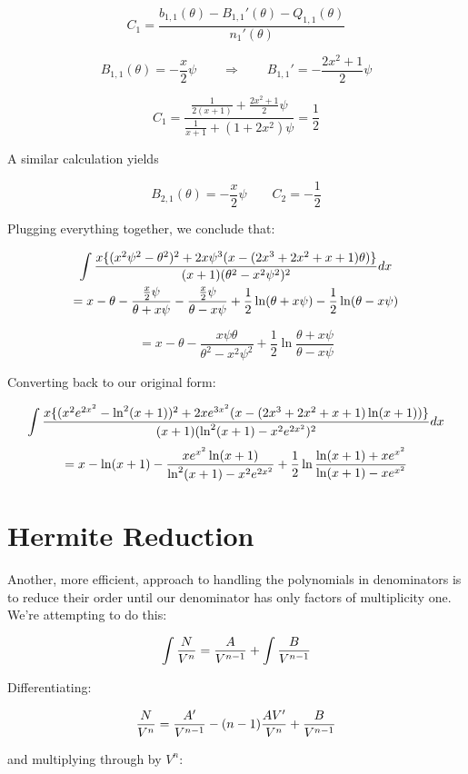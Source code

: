 $$ C_1 = \frac{b_{1,1}(\theta) - B_{1,1}'(\theta) - Q_{1,1}(\theta)}{n_1'(\theta)} $$

$$B_{1,1}(\theta) = -\frac{x}{2}\psi \qquad\Longrightarrow\qquad B_{1,1}' = -\frac{2x^2+1}{2}\psi$$

$$ C_1 = \frac{\frac{1}{2(x+1)} + \frac{2x^2+1}{2}\psi}{\frac{1}{x+1} + (1 + 2 x^2) \psi} = \frac{1}{2}$$

A similar calculation yields

$$B_{2,1}(\theta) = -\frac{x}{2}\psi \qquad C_2 = -\frac{1}{2}$$

Plugging everything together, we conclude that:

\begin{multline*}
\int{{x\{(x^2 \psi^2-\theta^2)^2+2x \psi^3(x-(2x^3+2x^2+x+1)\theta)\}}\over{(x+1)(\theta^2 - x^2\psi^2)^2}} dx \\
= x - \theta -\frac{\frac{x}{2}\psi}{\theta + x \psi} - \frac{\frac{x}{2}\psi}{\theta - x \psi} + \frac{1}{2}\ln(\theta + x\psi)- \frac{1}{2}\ln(\theta - x \psi)
\end{multline*}

$$ = x - \theta -\frac{x \psi \theta}{\theta^2 - x^2 \psi^2} + \frac{1}{2}\ln\frac{\theta + x\psi}{\theta - x \psi}$$

Converting back to our original form:

$$\int{{x\{(x^2e^{2x^2}-\ln^2(x+1))^2+2xe^{3x^2}(x-(2x^3+2x^2+x+1)\ln(x+1))\}}\over{(x+1)(\ln^2(x+1) - x^2e^{2x^2})^2}} dx$$
$$= x - \ln(x+1) - {x e^{x^2}\ln(x+1)\over{\ln^2(x+1)-x^2 e^{2x^2}}}
+ {1\over2}\ln\frac{\ln(x+1) + x e^{x^2}}{\ln(x+1) - x e^{x^2}}$$

\endexample

\vfill\eject

\section{Hermite Reduction}

Another, more efficient, approach to handling the polynomials in
denominators is to reduce their order until our denominator has only
factors of multiplicity one.  We're attempting to do this:

$$\int {N\over{V^n}} = {A\over{V^{n-1}}} + \int {B\over{V^{n-1}}}$$

Differentiating:

$${N\over{V^n}} = {A'\over{V^{n-1}}} - (n-1){AV'\over{V^n}} + {B\over{V^{n-1}}}$$

and multiplying through by $V^n$:

